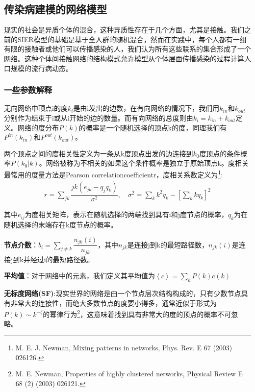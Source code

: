 \documentclass[UTF8]{ctexart}
\begin{document}
\subsection{传染病建模的网络模型}
现实的社会是异质个体的混合，这种异质性存在于几个方面，尤其是接触。我们之前的SIER模型的基础是基于全人群的随机混合，然而在实践中，每个人都有一组有限的接触者或他们可以传播感染的人，我们认为所有这些联系的集合形成了一个网络。这种个体间接触网络的结构模式允许模型从个体层面传播感染的过程计算人口规模的流行病动态。
\subsubsection{一些参数解释}
无向网络中顶点i的度$k_{i}$是由i发出的边数，在有向网络的情况下，我们用$k_{in}$和$k_{out}$分别作为结束于i或从i开始的边的数量。而有向网络的总度则由$k_{i}=k_{in}+k_{out}$定义。网络的度分布$P(k)$的概率是一个随机选择的顶点k的度，同理我们有$P^{in}(k_{in})$和$P^{out}(k_{out})$。
\par 两个顶点之间的度相关性定义为一条从k度顶点出发的边连接到$k_{0}$度顶点的条件概率$P(k_{0}|k)$。网络被称为不相关的如果这个条件概率是独立于原始顶点k。度相关最常用的度量方法是Pearson \quad correlation\quad coefficient\quad r，度相关系数定义为\footnote{M. E. J. Newman, Mixing patterns in networks, Phys. Rev. E 67 (2003) 026126.}:
\begin{equation}
	\begin{aligned}
		r=\sum\limits_{jk}\dfrac{jk(e_{jk}-q_{j}q_{k})}{\sigma^{2}},\quad \sigma^{2}=\sum\limits_{k}k^{2}q_{k}-[\sum\limits_{k}kq_{k}]^{2}
	\end{aligned}
\end{equation}
\par 其中$e_{ij}$为度相关矩阵，表示在随机选择的两端找到具有i和j度节点的概率，$q_{k}$为在随机选择的末端存在k度节点的概率。
\par \textbf{节点介数}：$b_{i}=\sum\limits_{j\neq k}\dfrac{n_{jk}(i)}{n_{jk}}$，其中$n_{jk}$是连接j到k的最短路径数，$n_{jk}(i)$是连接j到k并经过i的最短路径数。
\par \textbf{平均值}：对于网络中的元素，我们定义其平均值为$\left\langle c\right\rangle=\sum\limits_{k}P(k)c(k)$
\par \textbf{无标度网络(SF)}:现实世界的网络是由一个节点层次结构构成的，只有少数节点具有非常大的连接性，而绝大多数节点的度要小得多，通常近似于形式为$P(k)\sim k^{-\zeta}$的幂律行为\footnote{M. E. Newman, Properties of highly clustered networks, Physical Review E 68 (2) (2003) 026121.}，这意味着找到具有非常大的度的顶点的概率不可忽略。
\end{document}
